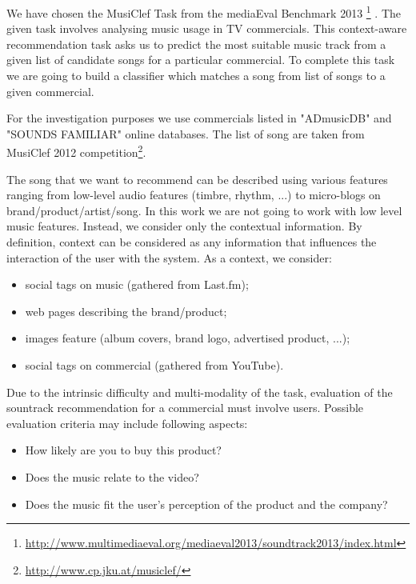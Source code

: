 \documentclass{llncs}
\begin{document}

We have chosen the MusiClef Task from the mediaEval Benchmark 2013 \footnote{\url{http://www.multimediaeval.org/mediaeval2013/soundtrack2013/index.html}} \cite{website:mediaeval}. The given task involves analysing music usage in TV commercials. This context-aware recommendation task asks us to predict the most suitable music track from a given list of candidate songs for a particular commercial. To complete this task we are going to build a classifier which matches a song from list of songs to a given commercial.

For the investigation purposes we use commercials listed in "ADmusicDB"\cite{website:admusicdb} and "SOUNDS FAMILIAR"\cite{website:sounds_familiar} online databases. The list of song are taken from MusiClef 2012 competition\footnote{\url{http://www.cp.jku.at/musiclef/}}\cite{schedl_etal:mmsys:2013}. 

The song that we want to recommend can be described using various features ranging from low-level audio features (timbre, rhythm, ...) to micro-blogs on brand/product/artist/song. In this work we are not going to work with low level music features. Instead, we consider only the contextual information. By definition, context can be considered as any information that influences the interaction of the user with the system\cite{kaminskas2012contextual}. As a context, we consider:
\begin{itemize}
  \item social tags on music (gathered from Last.fm);
  \item web pages describing the brand/product;
  \item images feature (album covers, brand logo, advertised product, ...);
  \item social tags on commercial (gathered from YouTube).
\end{itemize}

Due to the intrinsic difficulty and multi-modality of the task, evaluation of the sountrack recommendation for a commercial must involve users. Possible evaluation criteria may include following aspects:
\begin{itemize}
  \item How likely are you to buy this product?
  \item Does the music relate to the video?
  \item Does the music fit the user's perception of the product and the company?
\end{itemize}	
\end{document}
